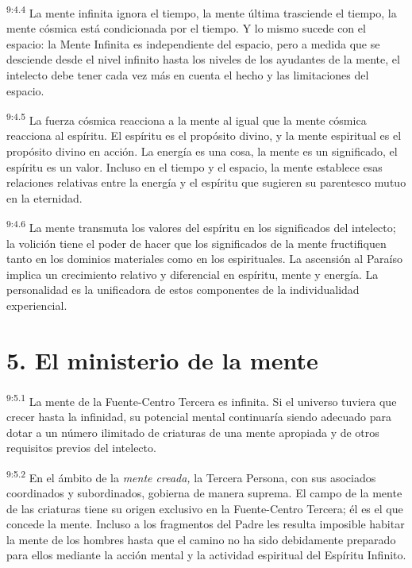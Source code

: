 \par
\textsuperscript{9:4.4} La mente infinita ignora el tiempo, la mente última trasciende el tiempo, la mente cósmica está condicionada por el tiempo. Y lo mismo sucede con el espacio: la Mente Infinita es independiente del espacio, pero a medida que se desciende desde el nivel infinito hasta los niveles de los ayudantes de la mente, el intelecto debe tener cada vez más en cuenta el hecho y las limitaciones del espacio.

\par
\textsuperscript{9:4.5} La fuerza cósmica reacciona a la mente al igual que la mente cósmica reacciona al espíritu. El espíritu es el propósito divino, y la mente espiritual es el propósito divino en acción. La energía es una cosa, la mente es un significado, el espíritu es un valor. Incluso en el tiempo y el espacio, la mente establece esas relaciones relativas entre la energía y el espíritu que sugieren su parentesco mutuo en la eternidad.

\par
\textsuperscript{9:4.6} La mente transmuta los valores del espíritu en los significados del intelecto; la volición tiene el poder de hacer que los significados de la mente fructifiquen tanto en los dominios materiales como en los espirituales. La ascensión al Paraíso implica un crecimiento relativo y diferencial en espíritu, mente y energía. La personalidad es la unificadora de estos componentes de la individualidad experiencial.

\section*{5. El ministerio de la mente}
\par
\textsuperscript{9:5.1} La mente de la Fuente-Centro Tercera es infinita. Si el universo tuviera que crecer hasta la infinidad, su potencial mental continuaría siendo adecuado para dotar a un número ilimitado de criaturas de una mente apropiada y de otros requisitos previos del intelecto.

\par
\textsuperscript{9:5.2} En el ámbito de la \textit{mente creada,} la Tercera Persona, con sus asociados coordinados y subordinados, gobierna de manera suprema. El campo de la mente de las criaturas tiene su origen exclusivo en la Fuente-Centro Tercera; él es el que concede la mente. Incluso a los fragmentos del Padre les resulta imposible habitar la mente de los hombres hasta que el camino no ha sido debidamente preparado para ellos mediante la acción mental y la actividad espiritual del Espíritu Infinito.

